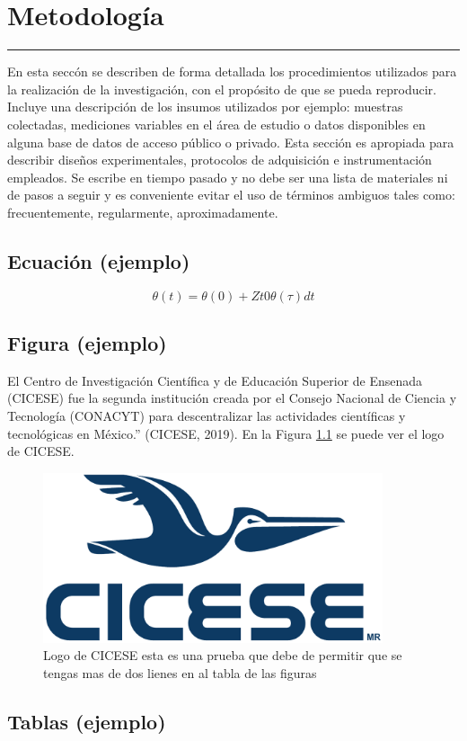 \chapter{Metodolog\'ia}\label{capit:cap2}
\vspace{-2.0325ex}%
\noindent
\rule{\textwidth}{0.5pt}
\vspace{-5.5ex}%
\newcommand{\pushline}{\Indp}%


En esta secc\'on se describen de forma detallada los procedimientos utilizados para la realizaci\'on de la investigaci\'on, con el propósito de que se pueda reproducir. Incluye una descripci\'on de los insumos utilizados por ejemplo: muestras colectadas, mediciones variables en el \'area de estudio o datos disponibles en alguna base de datos de acceso p\'ublico o privado. Esta secci\'on es apropiada para describir diseños experimentales, protocolos de adquisici\'on e instrumentaci\'on empleados. Se escribe en tiempo pasado y no debe ser una lista de materiales ni de pasos a seguir y es conveniente evitar el uso de t\'erminos ambiguos tales como: frecuentemente, regularmente, aproximadamente.
\\

\section{Ecuaci\'on (ejemplo)}\label{secc:ejemploec}

\begin{equation}
\theta(t) = \theta(0) + Zt0 \theta(\tau)dt
\label{eq:ejem}
\end{equation}

\section{Figura (ejemplo)}\label{secc:ejemplofig}

El Centro de Investigación Científica y de Educación Superior de Ensenada (CICESE) fue la segunda institución creada por el Consejo Nacional de Ciencia y Tecnología (CONACYT) para descentralizar las actividades científicas y tecnológicas en México.” (CICESE, 2019). En la Figura \ref{fig:ejemplo1} se puede ver el logo de CICESE. 


\begin{figure}[h]
        \centering
        \includegraphics[width=100mm]{./Figures/logoCicese2009.pdf}
        \caption{Logo de CICESE esta es una prueba que debe de permitir que se tengas mas de dos lienes en al tabla de las figuras} 
				\label{fig:ejemplo1}
\end{figure}

\section{Tablas (ejemplo)}\label{secc:ejemplotab}

		

\newpage
